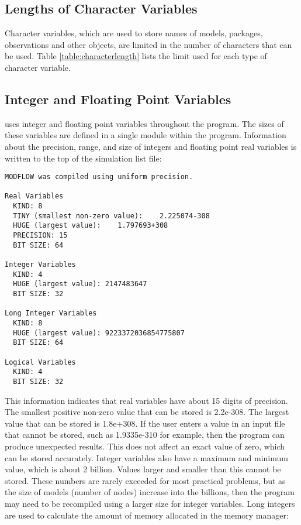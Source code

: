 \subsection{Lengths of Character Variables}
Character variables, which are used to store names of models, packages, observations and other objects, are limited in the number of characters that can be used. Table \ref{table:characterlength} lists the limit used for each type of character variable.

\FloatBarrier

\FloatBarrier

\subsection{Integer and Floating Point Variables}
\mf uses integer and floating point variables throughout the program.  The sizes of these variables are defined in a single module within the program.  Information about the precision, range, and size of integers and floating point real variables is written to the top of the simulation list file: 

{\small
\begin{lstlisting}[style=modeloutput]
MODFLOW was compiled using uniform precision.

Real Variables
  KIND: 8
  TINY (smallest non-zero value):    2.225074-308
  HUGE (largest value):    1.797693+308
  PRECISION: 15
  BIT SIZE: 64

Integer Variables
  KIND: 4
  HUGE (largest value): 2147483647
  BIT SIZE: 32

Long Integer Variables
  KIND: 8
  HUGE (largest value): 9223372036854775807
  BIT SIZE: 64

Logical Variables
  KIND: 4
  BIT SIZE: 32
\end{lstlisting}
}

This information indicates that real variables have about 15 digits of precision.  The smallest positive non-zero value that can be stored is 2.2e-308.  The largest value that can be stored is 1.8e+308.  If the user enters a value in an input file that cannot be stored, such as 1.9335e-310 for example, then the program can produce unexpected results.  This does not affect an exact value of zero, which can be stored accurately.  Integer variables also have a maximum and minimum value, which is about 2 billion.  Values larger and smaller than this cannot be stored.  These numbers are rarely exceeded for most practical problems, but as the size of models (number of nodes) increase into the billions, then the program may need to be recompiled using a larger size for integer variables. Long integers are used to calculate the amount of memory allocated in the memory manager:

